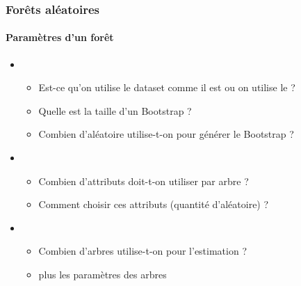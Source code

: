 \documentclass[xcolor=table]{beamer}
\begin{document}
\begin{frame}
	\frametitle{Forêts aléatoires}
	\framesubtitle{Paramètres d'un forêt}
	
	\begin{itemize}
		\item {}
		\begin{itemize}
			\item Est-ce qu'on utilise le dataset comme il est ou on utilise le  ?
			\item Quelle est la taille d'un Bootstrap ?
			\item Combien d'aléatoire utilise-t-on pour générer le Bootstrap ? 
		\end{itemize}
		\item {}
		\begin{itemize}
			\item Combien d'attributs doit-t-on utiliser par arbre ?
			\item Comment choisir ces attributs (quantité d'aléatoire) ?
		\end{itemize}
		\item {}
		\begin{itemize}
			\item Combien d'arbres utilise-t-on pour l'estimation ?
			\item plus les paramètres des arbres
		\end{itemize}
	\end{itemize}
	
\end{frame}

\end{document}
